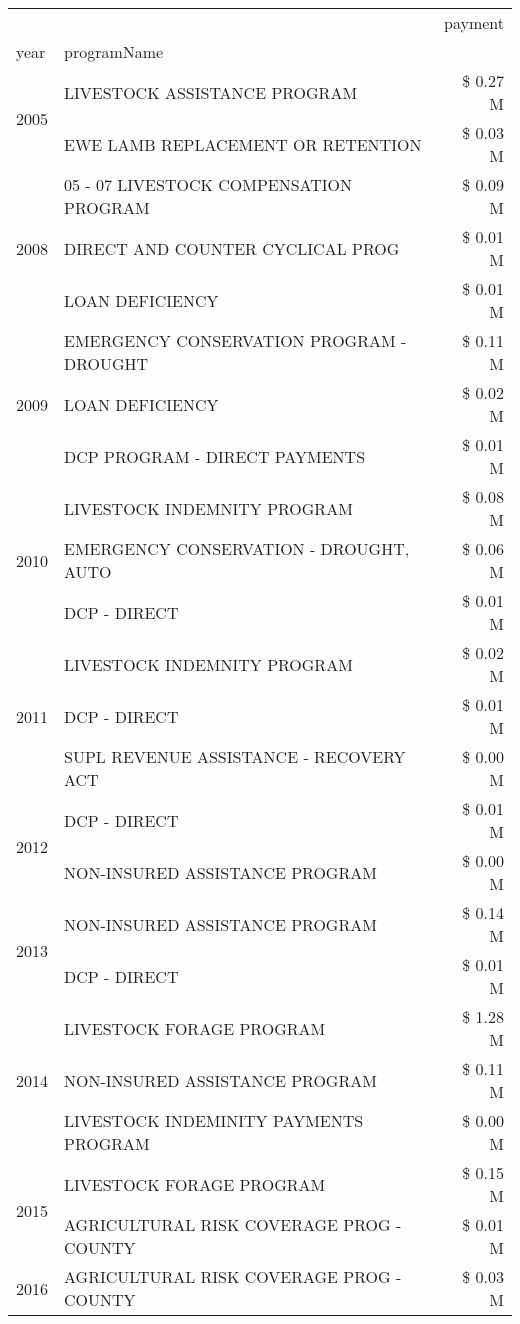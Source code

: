 \begin{tabular}{llr}
\toprule
 &  & payment \\
year & programName &  \\
\midrule
\multirow[t]{2}{*}{2005} & LIVESTOCK ASSISTANCE PROGRAM & \$ 0.27 M \\
 & EWE LAMB REPLACEMENT OR RETENTION & \$ 0.03 M \\
\cline{1-3}
\multirow[t]{3}{*}{2008} & 05 - 07 LIVESTOCK COMPENSATION PROGRAM & \$ 0.09 M \\
 & DIRECT AND COUNTER CYCLICAL PROG & \$ 0.01 M \\
 & LOAN DEFICIENCY & \$ 0.01 M \\
\cline{1-3}
\multirow[t]{3}{*}{2009} & EMERGENCY CONSERVATION PROGRAM - DROUGHT & \$ 0.11 M \\
 & LOAN DEFICIENCY & \$ 0.02 M \\
 & DCP PROGRAM - DIRECT PAYMENTS & \$ 0.01 M \\
\cline{1-3}
\multirow[t]{3}{*}{2010} & LIVESTOCK INDEMNITY PROGRAM & \$ 0.08 M \\
 & EMERGENCY CONSERVATION - DROUGHT, AUTO & \$ 0.06 M \\
 & DCP - DIRECT & \$ 0.01 M \\
\cline{1-3}
\multirow[t]{3}{*}{2011} & LIVESTOCK INDEMNITY PROGRAM & \$ 0.02 M \\
 & DCP - DIRECT & \$ 0.01 M \\
 & SUPL REVENUE ASSISTANCE - RECOVERY ACT & \$ 0.00 M \\
\cline{1-3}
\multirow[t]{2}{*}{2012} & DCP - DIRECT & \$ 0.01 M \\
 & NON-INSURED ASSISTANCE PROGRAM & \$ 0.00 M \\
\cline{1-3}
\multirow[t]{2}{*}{2013} & NON-INSURED ASSISTANCE PROGRAM & \$ 0.14 M \\
 & DCP - DIRECT & \$ 0.01 M \\
\cline{1-3}
\multirow[t]{3}{*}{2014} & LIVESTOCK FORAGE PROGRAM & \$ 1.28 M \\
 & NON-INSURED ASSISTANCE PROGRAM & \$ 0.11 M \\
 & LIVESTOCK INDEMINITY PAYMENTS PROGRAM & \$ 0.00 M \\
\cline{1-3}
\multirow[t]{2}{*}{2015} & LIVESTOCK FORAGE PROGRAM & \$ 0.15 M \\
 & AGRICULTURAL RISK COVERAGE PROG - COUNTY & \$ 0.01 M \\
\cline{1-3}
\multirow[t]{3}{*}{2016} & AGRICULTURAL RISK COVERAGE PROG - COUNTY & \$ 0.03 M \\

\end{tabular}
